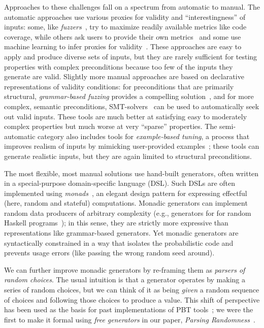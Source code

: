 Approaches to these challenges
fall on a spectrum from automatic to manual. The automatic approaches use
various proxies for validity and ``interestingness'' of
inputs: some, like {\em
fuzzers}~\cite{afl-readme}, try to maximize readily available metrics like code
coverage, while others ask users to provide their own metrics~\cite{loscher2017targetedpbt} and
some use machine learning to infer proxies for
validity~\cite{godefroid2017learn, DBLP:conf/icse/ReddyLPS20}. These approaches
are easy to apply and produce diverse sets of inputs, but they are rarely
sufficient for testing properties with complex
preconditions because too few of the inputs they generate are
valid. Slightly more
manual approaches are based on declarative representations of validity
conditions: for preconditions that are primarily structural, {\em grammar-based
fuzzing} provides a compelling solution~\cite{godefroid2008grammar,
holler2012fuzzing, veggalam2016ifuzzer, wang2019superion,
srivastava2021gramatron}, and for more complex, semantic preconditions,
SMT-solvers~\cite{dewey2017automated, beginners-luck,
steinhofel_input_2022} can be used to automatically seek out valid
inputs. These tools are
much better at satisfying easy to moderately complex properties but
much worse at very ``sparse'' properties. The semi-automatic
category also includes tools for {\em example-based tuning}, a process that
improves realism of inputs by mimicking user-provided
examples~\cite{soremekun2020inputs}; these tools can generate
realistic inputs, but they are again limited to structural preconditions.

The most flexible, most manual solutions use hand-built
generators, often written in a special-purpose domain-specific language (DSL).
Such DSLs are often implemented using {\em
monads\/}~\cite{moggi1991notions}, an elegant design pattern for
expressing effectful (here, random and stateful) computations. Monadic generators can implement random data producers of arbitrary complexity
(e.g., generators for for random Haskell
programs~\cite{palka_testing_2011}); in this sense, they are strictly more expressive than
representations like grammar-based generators.  Yet monadic generators are
syntactically constrained in a way that isolates the probabilistic code and
prevents usage errors (like passing the wrong random seed around).

We can further improve monadic generators by re-framing them as {\em
  parsers of random choices}. The usual intuition is that a generator
operates by making a series of random choices, but we can think of
it as being {\em given} a random sequence of choices and following
those choices to produce a value. This shift of perspective has been
used as the basis for past implementations of PBT
tools~\cite{maciver2019hypothesis, dolan2017testing}; we were the
first to make it
formal using {\em free generators}
in our paper, {\em Parsing Randomness}~\cite{goldstein2022parsing}.


